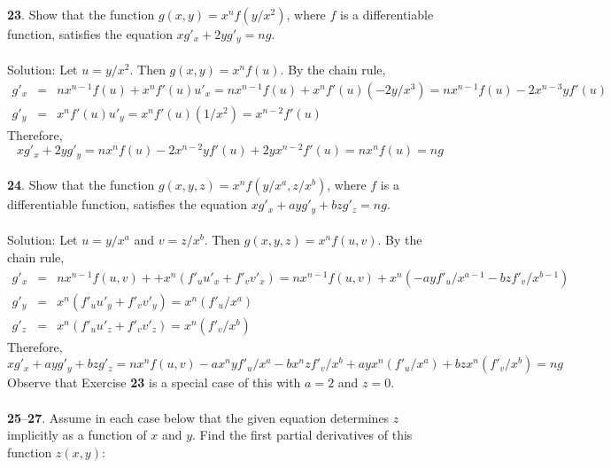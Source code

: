 \documentclass[12pt]{amsbook}
\begin{document}
{\small\bf 23}. Show that the function $g(x, y) = x^nf(y/x^2)$, where $f$ is a differentiable
function, satisfies the equation $xg'_x+2yg'_y=ng$.
\\
\\
{\sc Solution}: Let $u=y/x^2$. Then $g(x,y)=x^nf(u)$. By the chain rule,
\begin{eqnarray*}
g'_x&=&nx^{n-1}f(u)+x^nf'(u)u'_x=nx^{n-1}f(u)+x^nf'(u)(-2y/x^3)=nx^{n-1}f(u)-2x^{n-3}yf'(u)\\
g'_y&=&x^nf'(u)u'_y=x^nf'(u)(1/x^2)=x^{n-2}f'(u)
\end{eqnarray*}
Therefore,
$$xg'_x+2yg'_y=nx^nf(u)-2x^{n-2}yf'(u)+2yx^{n-2}f'(u)=nx^nf(u)=ng$$
\\
{\small\bf 24}. Show that the function $g(x, y,z) = x^nf(y/x^a,z/x^b)$, where $f$ is a differentiable
function, satisfies the equation $xg'_x+ayg'_y+bzg'_z=ng$.
\\
\\
{\sc Solution}: Let $u=y/x^a$ and $v=z/x^b$. Then $g(x,y,z)=x^nf(u,v)$. By the chain rule,
\begin{eqnarray*}
g'_x&=&nx^{n-1}f(u,v)++x^n(f'_uu'_x+f'_vv'_x)=nx^{n-1}f(u,v)+x^n(-ayf'_u/x^{a-1}-bzf'_v/x^{b-1}) \\
g'_y&=&x^n(f'_uu'_y+f'_vv'_y)=x^n(f'_u/x^a) \\
g'_z&=&x^n(f'_uu'_z+f'_vv'_z)=x^n(f'_v/x^b)
\end{eqnarray*}
Therefore,
$$xg'_x+ayg'_y+bzg'_z=nx^nf(u,v)-ax^nyf'_u/x^{a}-bx^nzf'_v/x^{b}+ayx^n(f'_u/x^a)+bzx^n(f'_v/x^b)=ng$$
Observe that Exercise {\bf 23} is a special case of this with $a=2$ and $z=0$. 
\\
\\
\noindent
{\small {\bf 25}--{\bf 27}}. Assume in each case below that the given equation determines $z$
implicitly as a function of $x$ and $y$. Find the first partial derivatives of this
function $z(x, y)$:
\end{document}
